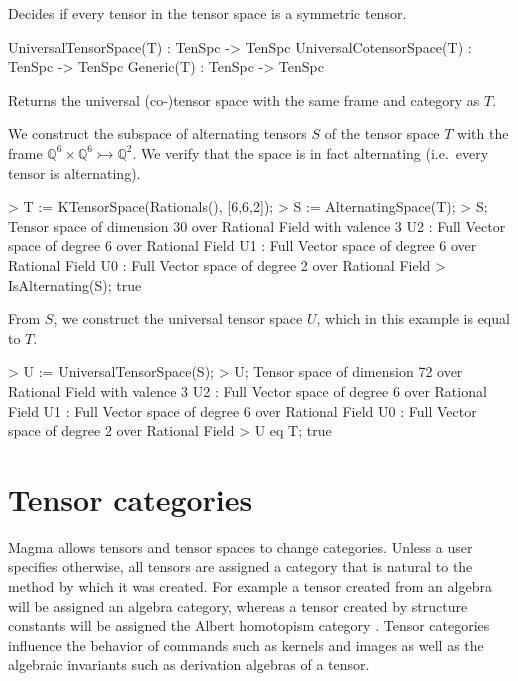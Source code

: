 Decides if every tensor in the tensor space is a symmetric tensor.

\begin{intrinsics}
UniversalTensorSpace(T) : TenSpc -> TenSpc
UniversalCotensorSpace(T) : TenSpc -> TenSpc
Generic(T) : TenSpc -> TenSpc
\end{intrinsics}

Returns the universal (co-)tensor space with the same frame and category as $T$.

\begin{example}[UniversalConst]

We construct the subspace of alternating tensors $S$ of the tensor space $T$ with the frame $\mathbb{Q}^6\times\mathbb{Q}^6\rightarrowtail \mathbb{Q}^2$. 
We verify that the space is in fact alternating (i.e.\ every tensor is alternating).
\begin{code}
> T := KTensorSpace(Rationals(), [6,6,2]);
> S := AlternatingSpace(T);
> S;
Tensor space of dimension 30 over Rational Field with valence 3
U2 : Full Vector space of degree 6 over Rational Field
U1 : Full Vector space of degree 6 over Rational Field
U0 : Full Vector space of degree 2 over Rational Field
> IsAlternating(S);
true
\end{code}

From $S$, we construct the universal tensor space $U$, which in this example is equal to $T$. 
\begin{code}
> U := UniversalTensorSpace(S);
> U;
Tensor space of dimension 72 over Rational Field with valence 3
U2 : Full Vector space of degree 6 over Rational Field
U1 : Full Vector space of degree 6 over Rational Field
U0 : Full Vector space of degree 2 over Rational Field
> U eq T;
true
\end{code}
\end{example}





\chapter{Tensor categories}\label{ch:tensor-categories}

Magma allows tensors and tensor spaces to change categories. 
Unless a user specifies otherwise,
all tensors are assigned a category that is natural to the method
by which it was created.
For example a tensor created from an algebra will be assigned an 
algebra category, whereas a tensor created by structure constants
will be assigned the Albert homotopism category \cite{Albert:Fundamentals}.  
Tensor categories influence
the behavior of commands such as kernels and images  
as well as the algebraic invariants such as derivation algebras of a tensor.  

